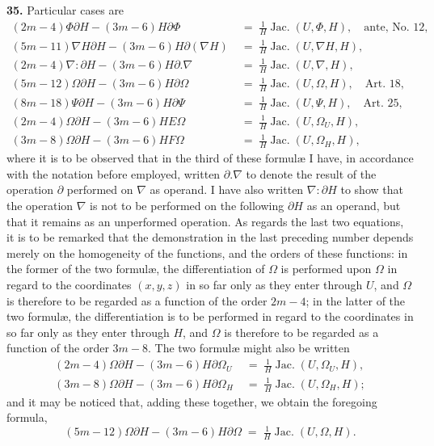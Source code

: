 \documentclass[11pt,a4paper]{article}
\providecommand{\Jac}{\operatorname{Jac.}}
\begin{document}
\medskip

\textbf{35.} Particular cases are
\begin{align*}
(2m-4)\Phi\partial H - (3m-6)H\partial\Phi &\;=\; \tfrac{1}{H}\Jac(U,\Phi,H), \quad \text{ante, No.~12},\\
(5m-11)\nabla H\partial H - (3m-6)H\partial(\nabla H) &\;=\; \tfrac{1}{H}\Jac(U,\nabla H,H),\\
(2m-4)\nabla:\partial H - (3m-6)H\partial.\nabla &\;=\; \tfrac{1}{H}\Jac(U,\nabla,H),\\
(5m-12)\Omega\partial H - (3m-6)H\partial\Omega &\;=\; \tfrac{1}{H}\Jac(U,\Omega,H),\quad \text{Art.~18},\\
(8m-18)\Psi\partial H - (3m-6)H\partial\Psi &\;=\; \tfrac{1}{H}\Jac(U,\Psi,H), \quad \text{Art.~25},\\
(2m-4)\Omega\partial H - (3m-6)HE\Omega &\;=\; \tfrac{1}{H}\Jac(U,\Omega_U,H),\\
(3m-8)\Omega\partial H - (3m-6)HF\Omega &\;=\; \tfrac{1}{H}\Jac(U,\Omega_H,H),
\end{align*}
where it is to be observed that in the third of these formul{\ae} I have, in accordance with the notation before employed, written $\partial.\nabla$ to denote the result of the operation $\partial$ performed on $\nabla$ as operand. I have also written $\nabla:\partial H$ to show that the operation $\nabla$ is not to be performed on the following $\partial H$ as an operand, but that it remains as an unperformed operation. As regards the last two equations, it is to be remarked that the demonstration in the last preceding number depends merely on the homogeneity of the functions, and the orders of these functions: in the former of the two formul{\ae}, the differentiation of $\Omega$ is performed upon $\Omega$ in regard to the coordinates $(x,y,z)$ in so far only as they enter through $U$, and $\Omega$ is therefore to be regarded as a function of the order $2m - 4$; in the latter of the two formul{\ae}, the differentiation is to be performed in regard to the coordinates in so far only as they enter through $H$, and $\Omega$ is therefore to be regarded as a function of the order $3m - 8$. The two formul{\ae} might also be written
\begin{align*}
(2m-4)\Omega\partial H - (3m-6)H\partial\Omega_U &\;=\; \tfrac{1}{H}\Jac(U,\Omega_U,H),\\
(3m-8)\Omega\partial H - (3m-6)H\partial\Omega_H &\;=\; \tfrac{1}{H}\Jac(U,\Omega_H,H);
\end{align*}
and it may be noticed that, adding these together, we obtain the foregoing formula,
\[
(5m-12)\Omega\partial H - (3m-6)H\partial\Omega \;=\; \tfrac{1}{H}\Jac(U,\Omega,H).
\]
\end{document}
